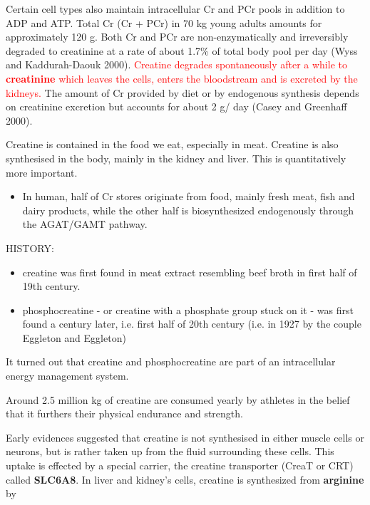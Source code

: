 Certain cell types also maintain intracellular Cr and PCr pools in addition to
ADP and ATP.  Total Cr (Cr + PCr) in 70 kg young adults amounts for
approximately 120 g. Both Cr and PCr are non-enzymatically and irreversibly
degraded to creatinine at a rate of about 1.7\% of total body pool per day (Wyss
and Kaddurah-Daouk 2000). \textcolor{red}{Creatine degrades spontaneously after
a while to {\bf creatinine} which leaves the cells, enters the bloodstream and
is excreted by the kidneys.} The amount of Cr provided by diet or by endogenous
synthesis depends on creatinine excretion but accounts for about 2 g/ day (Casey
and Greenhaff 2000).

\begin{mdframed}

Creatine is contained in the food we eat, especially in meat.
Creatine is also synthesised in the body, mainly in the kidney and liver. This
is quantitatively more important.
\begin{itemize}
  \item  In human, half of Cr stores originate from food, mainly fresh meat,
  fish and dairy products, while the other half is biosynthesized endogenously through the
AGAT/GAMT pathway.

\end{itemize}

HISTORY:
\begin{itemize}
  \item creatine was first found in meat extract resembling beef broth in first
  half of 19th century.

  \item  phosphocreatine - or creatine with a phosphate group stuck on it - was
  first found a century later, i.e. first half of 20th century (i.e. in 1927 by
  the couple Eggleton and Eggleton)
\end{itemize}
It turned out that creatine and phosphocreatine are part of an intracellular
energy management system.

Around 2.5 million kg of creatine are consumed yearly by athletes in the belief
that it furthers their physical endurance and strength.
\end{mdframed}

Early evidences suggested that creatine is not synthesised in either muscle
cells or neurons, but is rather taken up from the fluid surrounding these cells.
This uptake is effected by a special carrier, the creatine transporter (CreaT or
CRT) called {\bf SLC6A8}. In liver and kidney's cells, creatine is synthesized
from {\bf arginine} by


